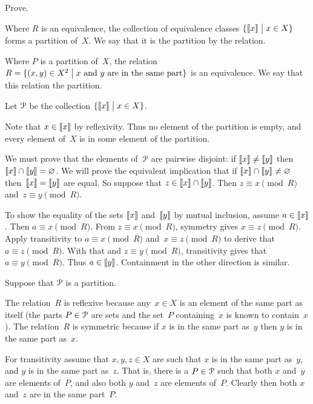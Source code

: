 \documentclass{ibl}  %
\begin{document}
\begin{ex} \label{ex:EquivClassesFormPartition}
Prove.
\begin{exes}
\item Where $R$ is an equivalence, 
  the collection of equivalence classes 
  $\{\llbracket x \rrbracket \bigm| x\in X\}$ forms a partition of~$X$.
  We say that it is the partition  by the relation.
\item Where $P$ is a partition of~$X$, 
  the relation 
  $R=\{(x,y)\in X^2 \bigm| \text{$x$ and~$y$ are in the same part}\}$ 
  is an equivalence.
  We say that this relation  the partition. 
\end{exes}
\begin{ans}
\begin{exes}
\item Let $\EuScript{P}$ be the collection $\{\llbracket x \rrbracket \bigm| x\in X\}$.
 
  Note that $x\in\llbracket x \rrbracket$ by reflexivity.
  Thus no element of the partition is empty, and 
  every element of~$X$ is in some element of the partition.

  We must prove that the elements of~$\EuScript{P}$ are pairwise disjoint:
  if $\llbracket x \rrbracket\neq\llbracket y \rrbracket$ 
  then~$\llbracket x \rrbracket\cap\llbracket y \rrbracket=\varnothing$.
  We will prove the equivalent implication that
  if $\llbracket x \rrbracket\cap\llbracket y \rrbracket\neq\varnothing$
  then~$\llbracket x \rrbracket=\llbracket y \rrbracket$ are equal.
  So suppose that $z\in\llbracket x \rrbracket\cap\llbracket y \rrbracket$.
  Then $z\equiv x\pmod R$ and~$z\equiv y\pmod R$.

  To show the equality of the sets $\llbracket x \rrbracket$ and~$\llbracket y \rrbracket$ 
  by mutual inclusion, assume $a\in\llbracket x \rrbracket$.
  Then $a\equiv x\pmod R$.
  From $z\equiv x\pmod R$, symmetry gives $x\equiv z\pmod R$.
  Apply transitivity to $a\equiv x\pmod R$ and~$x\equiv z\pmod R$ to
  derive that $a\equiv z\pmod R$.
  With that and $z\equiv y\pmod R$, transitivity gives
  that $a\equiv y\pmod R$. 
  Thus $a\in\llbracket y \rrbracket$.
  Containment in the other direction is similar.  
\item Suppose that $\EuScript{P}$ is a partition. 

  The relation~$R$ is reflexive because any~$x\in X$ is an element of
  the same part as itself
  (the parts $P\in\EuScript{P}$ are sets and the set~$P$ containing~$x$
  is known to contain~$x$).
  The relation~$R$ is symmetric because if $x$ is in the same part as~$y$
  then $y$ is in the same part as~$x$.

  For transitivity assume that $x,y,z\in X$ are such that 
  $x$ is in the same part as~$y$, and 
  $y$ is in the same part as~$z$.
  That is, there is a $P\in\EuScript{P}$ such that
  both $x$ and~$y$ are elements of~$P$, 
  and also both $y$ and~$z$ are elements of~$P$.
  Clearly then both $x$ and~$z$ are in the same part~$P$.
\end{exes}
\end{ans}
\end{ex}
\end{document}
